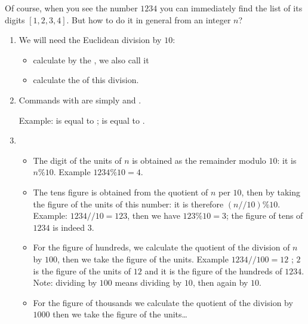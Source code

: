 \documentclass[11pt,class=report,crop=false]{standalone}
\begin{document}
\begin{cours}

Of course, when you see the number $1234$ you can immediately find the list of its digits $[1,2,3,4]$. But how to do it in general from an integer $n$?
 
\begin{enumerate}
  \item We will need the Euclidean division by $10$:
  \begin{itemize}
    \item calculate by  the , we also call it 
    \item calculate  the  of this division. 
  \end{itemize}
  
  
  \item Commands with \Python{} are simply  and .
  
  Example:  is equal to ;  is equal to .
  
  \item
  \begin{itemize}
    \item The digit of the units of $n$ is obtained as the remainder modulo $10$: it is $n\%10$. Example $1234 \% 10 = 4$.
    \item The tens figure is obtained from the quotient of $n$ per $10$, then by taking the figure of the units of this number: it is therefore $(n // 10) \% 10$.
   Example: $1234 // 10 = 123$, then we have $123 \% 10 = 3$; the figure of tens of $1234$ is indeed $3$.
   
   \item For the figure of hundreds, we calculate the quotient of the division of $n$ by $100$, then we take the figure of the units.  Example $1234 // 100 = 12$ ; $2$ is the figure of the units of $12$ and it is the figure of the hundreds of $1234$. Note: dividing by $100$ means dividing by $10$, then again by $10$.
   
   \item For the figure of thousands we calculate the quotient of the division by $1000$ then we take the figure of the units\ldots
   \end{itemize} 
 \end{enumerate}     

\end{cours}
\end{document}
